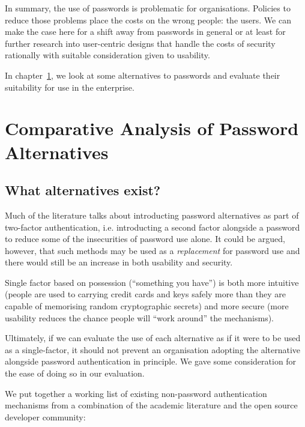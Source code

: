 \documentclass{report}
\begin{document}
In summary, the use of passwords is problematic for organisations. Policies
to reduce those problems place the costs on the wrong people: the users. We can
make the case here for a shift away from passwords in general or at least
for further research into user-centric designs that handle the costs of security
rationally with suitable consideration given to usability.

In chapter~\ref{chapter:alternatives}, we look at some alternatives to passwords
and evaluate their suitability for use in the enterprise.

\chapter{Comparative Analysis of Password Alternatives}
\label{chapter:alternatives}

\section{What alternatives exist?}

Much of the literature talks about introducting password alternatives
as part of two-factor authentication, i.e. introducting a second factor
alongside a password to reduce some of the insecurities of password use
alone. It could be argued, however, that such methods may be used as
a \emph{replacement} for password use and there would still be an increase
in both usability and security.

Single factor based on possession (``something
you have'') is both more intuitive (people are used to carrying credit cards
and keys safely more than they are capable of memorising random
cryptographic secrets) and more secure (more usability reduces the chance
people will ``work around'' the mechanisms).

Ultimately, if we can evaluate the use of each alternative as if it were
to be used as a single-factor, it should not prevent an organisation
adopting the alternative alongside password authentication in principle. We
gave some consideration for the ease of doing so in our evaluation.

We put together a working list of existing non-password authentication
mechanisms from a combination of the academic literature and the open source
developer community:
\end{document}
